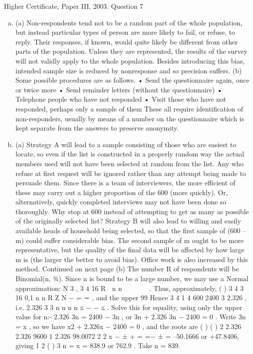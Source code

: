 \documentclass[a4paper,12pt]{article}
\begin{document}
Higher Certificate, Paper III, 2003. Question 7
\begin{enumerate}[(a)]
\item  (a) Non-respondents tend not to be a random part of the whole population,
but instead particular types of person are more likely to fail, or refuse,
to reply. Their responses, if known, would quite likely be different
from other parts of the population. Unless they are represented, the
results of the survey will not validly apply to the whole population.
Besides introducing this bias, intended sample size is reduced by nonresponse
and so precision suffers.
(b) Some possible procedures are as follows.
• Send the questionnaire again, once or twice more
• Send reminder letters (without the questionnaire)
• Telephone people who have not responded
• Visit those who have not responded, perhaps only a sample of them
These all require identification of non-responders, usually by means of
a number on the questionnaire which is kept separate from the answers
to preserve anonymity.
\item (a) Strategy A will lead to a sample consisting of those who are easiest to
locate, so even if the list is constructed in a properly random way the
actual members used will not have been selected at random from the
list. Any who refuse at first request will be ignored rather than any
attempt being made to persuade them. Since there is a team of
interviewers, the more efficient of these may carry out a higher
proportion of the 600 (more quickly). Or, alternatively, quickly
completed interviews may not have been done so thoroughly. Why
stop at 600 instead of attempting to get as many as possible of the
originally selected list?
Strategy B will also lead to willing and easily available heads of
household being selected, so that the first sample of (600 – m) could
suffer considerable bias. The second sample of m ought to be more
representative, but the quality of the final data will be affected by how
large m is (the larger the better to avoid bias). Office work is also
increased by this method.
Continued on next page
(b) The number R of respondents will be Binomial(n, ¾). Since n is bound
to be a large number, we may use a Normal approximation:
N 3 , 3
4 16
R  n n 
 
 
∼ .
Thus, approximately,
( )
3
4
3
16
0,1
n
n
R
Z N
−
= ∼ ,
and the upper 99%
Hence
3
4
1
4
600 2400 3 2.326 , i.e. 2.326
3 3
n n
n n
≤
− − ≤ .
Solve this for equality, using only the upper value for n:-
2.326 3n = 2400 − 3n , or 3n + 2.326 3n − 2400 = 0 .
Write 3n = x , so we have x2 + 2.326x − 2400 = 0 , and the roots are
( ) ( )
2 2.326 2.326 9600 1 2.326 98.0072
2 2
x
− ± +
= =− ±
= –50.1666 or +47.8406,
giving
1 2 ( )
3 n = x = 838.9 or 762.9 . Take n = 839.
\end{enumerate}
\end{document}
